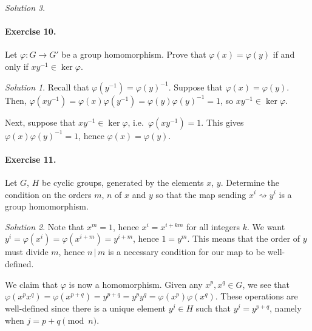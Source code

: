 \documentclass[11pt]{report}
\theoremstyle{remark}
\newtheorem*{solution}{Solution}
\begin{document}
\begin{solution}
    \paragraph{Exercise 10.} Let $\varphi\colon G \to G'$ be a group homomorphism.
    Prove that $\varphi(x) = \varphi(y)$ if and only if $xy^{-1} \in \ker{\varphi}$.
    \begin{solution}
        Recall that $\varphi(y^{-1}) = \varphi(y)^{-1}$. Suppose that $\varphi(x) =
        \varphi(y)$. Then, $\varphi(xy^{-1}) = \varphi(x)\varphi(y^{-1}) =
        \varphi(y)\varphi(y)^{-1} = 1$, so $xy^{-1} \in \ker{\varphi}$.

        Next, suppose that $xy^{-1} \in \ker{\varphi}$, i.e.\ $\varphi(xy^{-1}) =
        1$. This gives $\varphi(x)\varphi(y)^{-1} = 1$, hence $\varphi(x) =
        \varphi(y)$.
    \end{solution}

    \paragraph{Exercise 11.} Let $G$, $H$ be cyclic groups, generated by the
    elements $x$, $y$. Determine the condition on the orders $m$, $n$ of $x$ and $y$
    so that the map sending $x^i \rightsquigarrow y^i$ is a group homomorphism.
    \begin{solution}
        Note that $x^m = 1$, hence $x^{i} = x^{i + km}$ for all integers $k$. We
        want $y^i = \varphi(x^i) = \varphi(x^{i + m}) = y^{i + m}$, hence
        $1 = y^{m}$. This means that the order of $y$ must divide $m$, hence $n \,|\,
        m$ is a necessary condition for our map to be well-defined.

        We claim that $\varphi$ is now a homomorphism. Given any $x^p, x^q \in G$,
        we see that $\varphi(x^px^q) = \varphi(x^{p + q}) = y^{p + q} = y^p y^q =
        \varphi(x^p)\varphi(x^q)$. These operations are well-defined since there is
        a unique element $y^j \in H$ such that $y^j = y^{p + q}$, namely when $j = p
        + q \pmod{n}$.
    \end{solution}
    

\end{solution}
\end{document}
